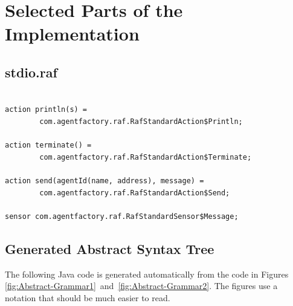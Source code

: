 \documentclass[a4paper,12pt,oneside,fleqn]{book} %
\begin{document}
\chapter{Selected Parts of the Implementation}\label{app:code} %

\section{stdio.raf}\label{app:stdio} %

\begin{verbatim}

action println(s) = 
        com.agentfactory.raf.RafStandardAction$Println;

action terminate() = 
        com.agentfactory.raf.RafStandardAction$Terminate;

action send(agentId(name, address), message) =
        com.agentfactory.raf.RafStandardAction$Send;

sensor com.agentfactory.raf.RafStandardSensor$Message;

\end{verbatim}

\section{Generated Abstract Syntax Tree}\label{app:ast} %

The following Java code is generated automatically
  from the code in Figures
  \ref{fig:Abstract-Grammar1}~and~\ref{fig:Abstract-Grammar2}.
The figures use a notation that should be much easier to read.
\end{document}
